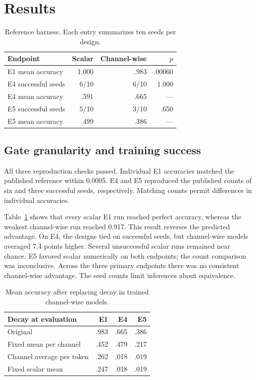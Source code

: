 \documentclass[conference]{IEEEtran}
\begin{document}
\section{Results}
\begin{table}[t]\centering\caption{Reference harness. Each entry summarizes ten seeds per design.}\label{t1}
\begin{tabular}{lrrr}\toprule Endpoint&Scalar&Channel-wise&$p$\\\midrule
E1 mean accuracy&1.000&.983&.00060\\
E4 successful seeds&6/10&6/10&1.000\\
E4 mean accuracy&.591&.665&---\\
E5 successful seeds&5/10&3/10&.650\\
E5 mean accuracy&.499&.386&---\\\bottomrule\end{tabular}\end{table}
\subsection{Gate granularity and training success}
All three reproduction checks passed. Individual E1 accuracies matched the published reference within 0.0005. E4 and E5 reproduced the published counts of six and three successful seeds, respectively. Matching counts permit differences in individual accuracies.

Table~\ref{t1} shows that every scalar E1 run reached perfect accuracy, whereas the weakest channel-wise run reached 0.917. This result reverses the predicted advantage. On E4, the designs tied on successful seeds, but channel-wise models averaged 7.4 points higher. Several unsuccessful scalar runs remained near chance. E5 favored scalar numerically on both endpoints; the count comparison was inconclusive. Across the three primary endpoints there was no consistent channel-wise advantage. The seed counts limit inferences about equivalence.
\begin{table}[t]\centering\caption{Mean accuracy after replacing decay in trained channel-wise models.}\label{t2}
\begin{tabular}{lrrr}\toprule Decay at evaluation&E1&E4&E5\\\midrule
Original&.983&.665&.386\\
Fixed mean per channel&.452&.479&.217\\
Channel average per token&.262&.018&.019\\
Fixed scalar mean&.247&.018&.019\\\bottomrule\end{tabular}\end{table}
\end{document}
